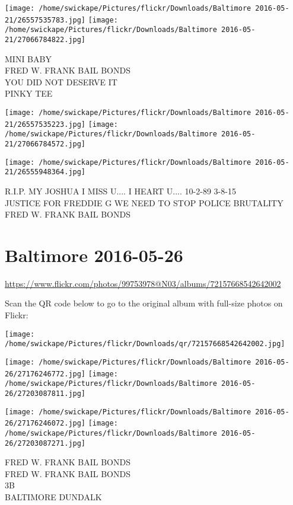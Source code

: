 \documentclass[10pt,letterpaper]{article}
\begin{document}
\texttt{[image: /home/swickape/Pictures/flickr/Downloads/Baltimore 2016-05-21/26557535783.jpg]}
\texttt{[image: /home/swickape/Pictures/flickr/Downloads/Baltimore 2016-05-21/27066784822.jpg]}

MINI BABY\\
FRED W. FRANK BAIL BONDS\\
YOU DID NOT DESERVE IT\\
PINKY TEE
\pagebreak

\texttt{[image: /home/swickape/Pictures/flickr/Downloads/Baltimore 2016-05-21/26557535223.jpg]}
\texttt{[image: /home/swickape/Pictures/flickr/Downloads/Baltimore 2016-05-21/27066784572.jpg]}

\vspace{0.25in}
\texttt{[image: /home/swickape/Pictures/flickr/Downloads/Baltimore 2016-05-21/26555948364.jpg]}

R.I.P. MY JOSHUA I MISS U.... I HEART U.... 10{-}2{-}89 3{-}8{-}15\\
JUSTICE FOR FREDDIE G WE NEED TO STOP POLICE BRUTALITY\\
FRED W. FRANK BAIL BONDS
\pagebreak

\section*{Baltimore 2016-05-26}

\url{https://www.flickr.com/photos/99753978@N03/albums/72157668542642002}

Scan the QR code below to go to the original album with full-size photos on Flickr:

\texttt{[image: /home/swickape/Pictures/flickr/Downloads/qr/72157668542642002.jpg]}
\pagebreak

\texttt{[image: /home/swickape/Pictures/flickr/Downloads/Baltimore 2016-05-26/27176246772.jpg]}
\texttt{[image: /home/swickape/Pictures/flickr/Downloads/Baltimore 2016-05-26/27203087811.jpg]}

\texttt{[image: /home/swickape/Pictures/flickr/Downloads/Baltimore 2016-05-26/27176246072.jpg]}
\texttt{[image: /home/swickape/Pictures/flickr/Downloads/Baltimore 2016-05-26/27203087271.jpg]}

FRED W. FRANK BAIL BONDS\\
FRED W. FRANK BAIL BONDS\\
3B\\
BALTIMORE DUNDALK
\pagebreak
\end{document}
